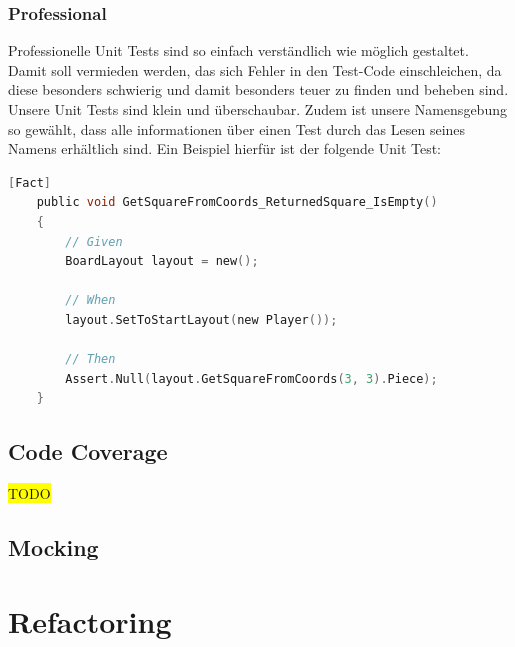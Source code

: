 \documentclass[
10pt, %
a4paper, %
oneside, %
headinclude,footinclude, %
BCOR5mm, %
]{scrartcl}
\begin{document}
\begin{onehalfspace}
\subsubsection{Professional}
Professionelle Unit Tests sind so einfach verständlich wie möglich gestaltet. Damit soll vermieden werden, das sich Fehler in den Test-Code einschleichen, da diese besonders schwierig und damit besonders teuer zu finden und beheben sind.
Unsere Unit Tests sind klein und überschaubar. Zudem ist unsere Namensgebung so gewählt, dass alle informationen über einen Test durch das Lesen seines Namens erhältlich sind. Ein Beispiel hierfür ist der folgende Unit Test:
\begin{lstlisting}[language=c, style=mStyle]
	[Fact]
	public void GetSquareFromCoords_ReturnedSquare_IsEmpty()
	{
		// Given
		BoardLayout layout = new();

		// When
		layout.SetToStartLayout(new Player());
		
		// Then
		Assert.Null(layout.GetSquareFromCoords(3, 3).Piece);
	}
\end{lstlisting}

\subsection{Code Coverage}
\colorbox{yellow}{TODO}
\subsection{Mocking}
\newpage
\section{Refactoring}

\end{onehalfspace}
\end{document}
